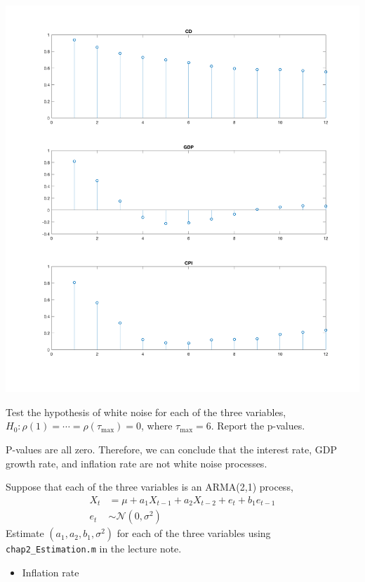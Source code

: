 \documentclass[answers]{exam}
\begin{document}
\begin{questions}
\begin{solution}
        \includegraphics[scale=0.2]{Problem2.png}
    \end{solution}
    \question
    Test the hypothesis of white noise for each of the three variables, $H_{0}:\rho(1)=\cdots = \rho (\tau_{\max})=0$, where $\tau_{\max}=6$. Report the p-values.
    \begin{solution}
        P-values are all zero. Therefore, we can conclude that the interest rate, GDP growth rate, and inflation rate are not white noise processes.
    \end{solution}
    \question
    Suppose that each of the three variables is an ARMA(2,1) process,
    \begin{align}
        X_{t} &= \mu+a_{1}X_{t-1}+a_{2}X_{t-2}+e_{t}+b_{1}e_{t-1}\\
        e_{t}&\sim \mathcal{N}\left(0,\sigma^{2}\right)
    \end{align}
    Estimate $\left(a_{1},a_{2},b_{1},\sigma^{2}\right)$ for each of the three variables using \texttt{chap2\_Estimation.m} in the lecture note.
    \begin{solution}
    \begin{itemize}
        \item Inflation rate

\end{itemize}
\end{solution}
\end{questions}
\end{document}
